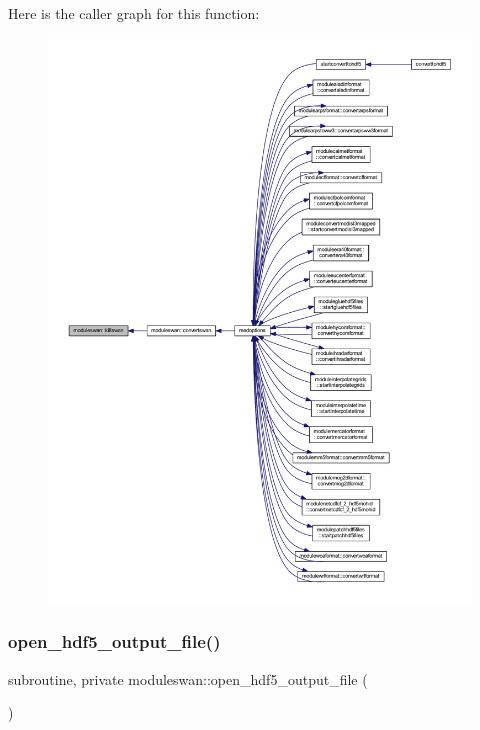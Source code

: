 Here is the caller graph for this function\+:\nopagebreak
\begin{figure}[H]
\begin{center}
\leavevmode
\includegraphics[width=350pt]{namespacemoduleswan_a649aac26c71119742c249a918e913f5e_icgraph}
\end{center}
\end{figure}
\mbox{\label{namespacemoduleswan_a857ac03cf8baadbf286cb5fb151b21fc}} 
\subsubsection{\texorpdfstring{open\+\_\+hdf5\+\_\+output\+\_\+file()}{open\_hdf5\_output\_file()}}
{\footnotesize\ttfamily subroutine, private moduleswan\+::open\+\_\+hdf5\+\_\+output\+\_\+file (\begin{DoxyParamCaption}{ }\end{DoxyParamCaption})\hspace{0.3cm}{\ttfamily [private]}}

